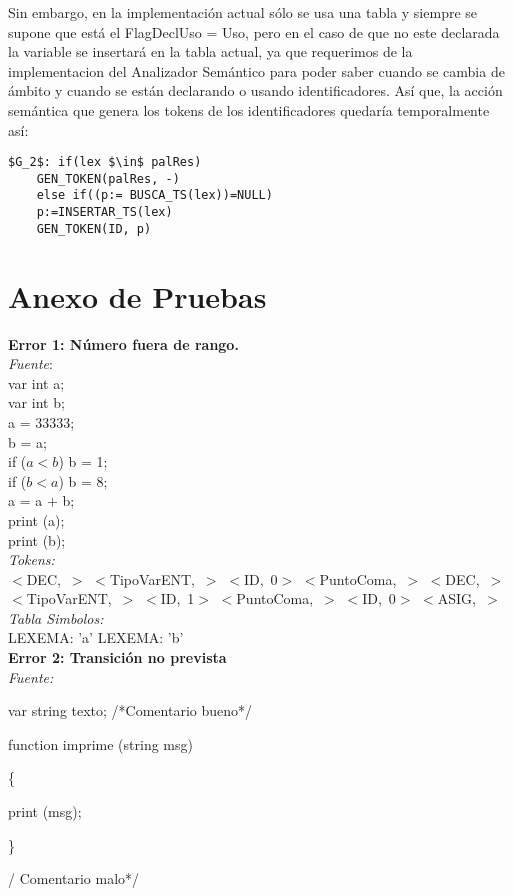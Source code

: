 \documentclass[a4paper, 12pt]{article}
\begin{document}
Sin embargo, en la implementación actual sólo se usa una tabla y siempre se supone que está el FlagDeclUso = Uso, pero en el caso de que no este declarada la variable se insertará en la tabla actual, ya que requerimos de la implementacion del Analizador Semántico para poder saber cuando se cambia de ámbito y cuando se están declarando o usando identificadores. Así que, la acción semántica que genera los tokens de los identificadores quedaría temporalmente así:
\begin{lstlisting}
$G_2$: if(lex $\in$ palRes)
	GEN_TOKEN(palRes, -)
    else if((p:= BUSCA_TS(lex))=NULL)
	p:=INSERTAR_TS(lex)
	GEN_TOKEN(ID, p)
\end{lstlisting}

\section{Anexo de Pruebas}

\textbf{Error 1: Número fuera de rango.} \\ 
\emph{Fuente}: \\
var int a; \\
var int b;\\
a = 33333;\\
b = a;\\
 if ($a  <  b$) b  =  1; \\
if ($b  <  a$) b  =  8;\\
 a = a  $+$  b;\\
print (a);\\
print (b);\medskip\\
\emph{Tokens:}\\ 
\mbox{$<$DEC, $>$}
\mbox{$<$TipoVarENT, $>$}
\mbox{$<$ID, 0$>$}
\mbox{$<$PuntoComa, $>$}
\mbox{$<$DEC, $>$}
\mbox{$<$TipoVarENT, $>$}
\mbox{$<$ID, 1$>$}
\mbox{$<$PuntoComa, $>$}
\mbox{$<$ID, 0$>$}
\mbox{$<$ASIG, $>$}\medskip\\
\emph{Tabla Simbolos:}\\
  LEXEMA: 'a'
  LEXEMA: 'b'\bigskip \\
\textbf{Error 2: Transición no prevista}\medskip\\
\emph{Fuente:} 


var string texto; /*Comentario bueno*/

 function imprime (string msg)
 
\{

	print (msg);
	
\} 

/ Comentario malo*/
\end{document}
